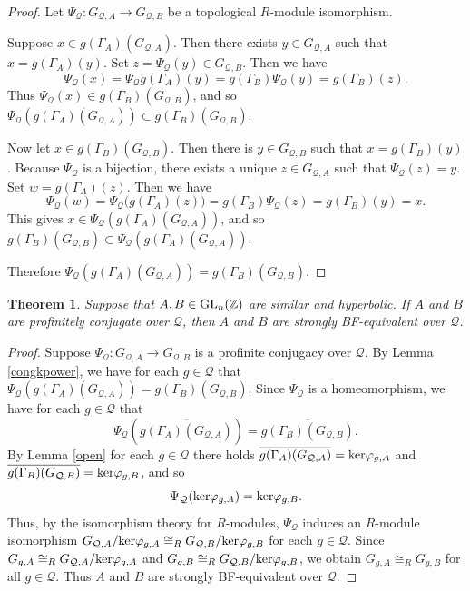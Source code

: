 \documentclass{amsart}
\theoremstyle{plain}
\newtheorem{theorem}{Theorem}[section]
\theoremstyle{definition}
\theoremstyle{remark}
\begin{document}
\begin{proof} Let $\Psi_{\mathcal Q}:G_{ {\mathcal Q},A}\to G_{ {\mathcal Q},B}$ be a topological $R$-module isomorphism. 

Suppose $x\in g(\Gamma_A)(G_{ {\mathcal Q},A})$. Then there exists $y\in G_{ {\mathcal Q},A}$ such that $x = g(\Gamma_A)(y)$. Set $z= \Psi_{\mathcal Q}(y) \in G_{ {\mathcal Q},B}$. Then we have
\[ \Psi_{\mathcal Q}(x) = \Psi_{\mathcal Q} g(\Gamma_A) (y) =  g(\Gamma_B)\Psi_{\mathcal Q} (y) =  g(\Gamma_B)(z). \]
Thus $\Psi_{\mathcal Q}(x) \in g(\Gamma_B)(G_{ {\mathcal Q},B}) $, and so $\Psi_{\mathcal Q}( g(\Gamma_A)(G_{ {\mathcal Q},A}) ) \subset  g(\Gamma_B) (G_{ {\mathcal Q},B}) $.

Now let $x\in g(\Gamma_B)(G_{ {\mathcal Q},B})$. Then there is $y\in G_{ {\mathcal Q},B}$ such that $x =  g(\Gamma_B)(y)$. Because $\Psi_{\mathcal Q}$ is a bijection, there exists a unique  $z\in G_{ {\mathcal Q},A}$ such that $\Psi_{\mathcal Q}(z) = y$. Set $w = g(\Gamma_A)(z)$. Then we have
\[ \Psi_{\mathcal Q} (w)= \Psi_{\mathcal Q}\big(g(\Gamma_A)(z) \big) =  g(\Gamma_B)\Psi_{\mathcal Q} (z) =  g(\Gamma_B)(y) = x.\]
This gives $x\in \Psi_{\mathcal Q}( g(\Gamma_A)(G_{ {\mathcal Q},A})  )$, and so $g(\Gamma_B)( G_{ {\mathcal Q},B}) \subset \Psi_{\mathcal Q} ( g(\Gamma_A)(G_{ {\mathcal Q},A})  )$.

Therefore $\Psi_{\mathcal Q}( g(\Gamma_A)(G_{ {\mathcal Q},A})  ) = g(\Gamma_B)(G_{ {\mathcal Q},B}) $.
\end{proof}

\begin{theorem}\label{main} Suppose that $A,B\in {\rm GL}_n({\mathbb Z})$ are similar and hyperbolic. If $A$ and $B$ are profinitely conjugate over ${\mathcal Q}$, then $A$ and $B$ are strongly {\rm BF}-equivalent over ${\mathcal Q}$.
\end{theorem}

\begin{proof} Suppose $\Psi_{\mathcal Q}:G_{ {\mathcal Q},A}\to G_{ {\mathcal Q},B}$ is a profinite conjugacy over ${\mathcal Q}$. By Lemma \ref{congkpower}, we have for each $g\in{\mathcal Q}$ that $\Psi_{\mathcal Q}( g(\Gamma_A)(G_{ {\mathcal Q},A})) = g(\Gamma_B)(G_{ {\mathcal Q},B})$. Since $\Psi_{\mathcal Q}$ is a homeomorphism, we have for each $g\in {\mathcal Q}$ that
\[ \Psi_{\mathcal Q}\left(\overline{g(\Gamma_A)(G_{ {\mathcal Q},A})}\right)  = \overline{ g(\Gamma_B)(G_{ {\mathcal Q},B}) }.\]
By Lemma \ref{open} for each $g\in {\mathcal Q}$ there holds $\overline{ g(\Gamma_A)(G_{ {\mathcal Q},A}) } = {\rm ker}\varphi_{g,A}$ and $\overline{ g(\Gamma_B)(G_{ {\mathcal Q},B}) } = {\rm ker}\varphi_{g,B}$, and so
\[ \Psi_{\mathcal Q}( {\rm ker}\varphi_{g,A})  = {\rm ker}\varphi_{g,B}.\]
Thus, by the isomorphism theory for $R$-modules, $\Psi_{\mathcal Q}$ induces an $R$-module isomorphism $G_{ {\mathcal Q},A}/{\rm ker}\varphi_{g,A} \cong_R G_{ {\mathcal Q},B}/{\rm ker}\varphi_{g,B}$ for each $g\in {\mathcal Q}$. Since $G_{g,A} \cong_R G_{ {\mathcal Q},A}/{\rm ker}\varphi_{g,A}$ and $G_{g,B}\cong_R G_{ {\mathcal Q},B}/{\rm ker}\varphi_{g,B}$, we obtain $G_{g,A} \cong_R G_{g,B}$ for all $g\in{\mathcal Q}$. Thus $A$ and $B$ are strongly {\rm BF}-equivalent over ${\mathcal Q}$.
\end{proof}
\end{document}
